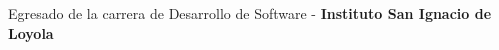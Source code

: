 %


\begin{scholarship}
					{Egresado de la carrera de Desarrollo de Software - \textbf{Instituto San Ignacio de Loyola}}


\end{scholarship}